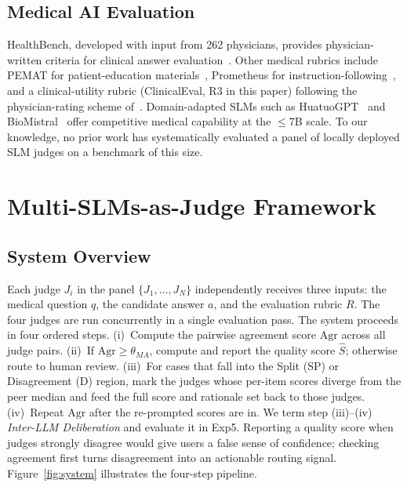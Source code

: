 \documentclass[conference]{IEEEtran}
\begin{document}
\subsection{Medical AI Evaluation}
HealthBench, developed with input from 262 physicians, provides
physician-written criteria for clinical answer
evaluation~\cite{arora2025healthbench}. Other medical rubrics
include PEMAT for patient-education
materials~\cite{shoemaker2014development}, Prometheus for
instruction-following~\cite{kim2024prometheus}, and a clinical-utility
rubric (ClinicalEval, R3 in this paper) following the
physician-rating scheme of~\cite{ho2024qualitative}. Domain-adapted
SLMs such as HuatuoGPT~\cite{zhang2023huatuogpt} and
BioMistral~\cite{labrak2024biomistral} offer competitive medical
capability at the $\leq$7B scale. To our knowledge, no prior work
has systematically evaluated a panel of locally deployed SLM judges
on a benchmark of this size.

\section{Multi-SLMs-as-Judge Framework}

\subsection{System Overview}

Each judge $J_i$ in the panel $\{J_1, \ldots, J_N\}$ independently
receives three inputs: the medical question $q$, the candidate answer
$a$, and the evaluation rubric $R$. The four judges are run
concurrently in a single evaluation pass. The system proceeds in
four ordered steps. (i)~Compute the pairwise agreement score
$\mathrm{Agr}$ across all judge pairs. (ii)~If
$\mathrm{Agr} \geq \theta_{MA}$, compute and report the quality
score $\hat{S}$; otherwise route to human review. (iii)~For cases
that fall into the Split (SP) or Disagreement (D) region, mark the
judges whose per-item scores diverge from the peer median and feed
the full score and rationale set back to those judges. (iv)~Repeat
$\mathrm{Agr}$ after the re-prompted scores are in. We term step
(iii)--(iv) \emph{Inter-LLM Deliberation} and evaluate it in
Exp5. Reporting a quality score when judges strongly disagree would
give users a false sense of confidence; checking agreement first
turns disagreement into an actionable routing signal. Figure~\ref{fig:system}
illustrates the four-step pipeline.
\end{document}
